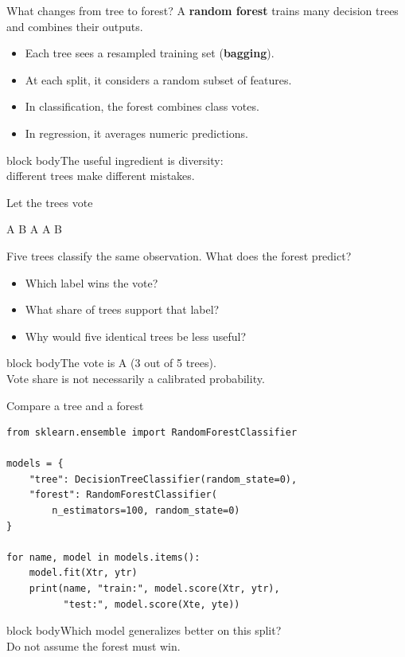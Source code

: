 \documentclass[aspectratio=43,11pt]{beamer}
\newcommand{\takeaway}[1]{\medskip\begin{beamercolorbox}[wd=\linewidth,sep=8pt,rounded=false]{block body}#1\end{beamercolorbox}}
\newcommand{\activity}[1]{\medskip\begin{beamercolorbox}[wd=\linewidth,sep=9pt]{block body}#1\end{beamercolorbox}}
\begin{document}
\begin{frame}{What changes from tree to forest?}
A \textbf{random forest} trains many decision trees and combines their outputs.
\vspace{0.7em}
\begin{itemize}
\item Each tree sees a resampled training set (\textbf{bagging}).
\item At each split, it considers a random subset of features.
\item In classification, the forest combines class votes.
\item In regression, it averages numeric predictions.
\end{itemize}
\takeaway{The useful ingredient is diversity:\\different trees make different mistakes.}
\end{frame}

\begin{frame}{Let the trees vote}
\begin{center}\LARGE A \quad B \quad A \quad A \quad B\end{center}
\vspace{1em}
Five trees classify the same observation. What does the forest predict?
\vspace{0.7em}
\begin{itemize}
\item Which label wins the vote?
\item What share of trees support that label?
\item Why would five identical trees be less useful?
\end{itemize}
\takeaway{The vote is A (3 out of 5 trees).\\
Vote share is not necessarily a calibrated probability.}
\end{frame}

\begin{frame}[fragile]{Compare a tree and a forest}
\begin{lstlisting}
from sklearn.ensemble import RandomForestClassifier

models = {
    "tree": DecisionTreeClassifier(random_state=0),
    "forest": RandomForestClassifier(
        n_estimators=100, random_state=0)
}

for name, model in models.items():
    model.fit(Xtr, ytr)
    print(name, "train:", model.score(Xtr, ytr),
          "test:", model.score(Xte, yte))
\end{lstlisting}
\activity{Which model generalizes better on this split?\\
Do not assume the forest must win.}
\end{frame}
\end{document}
